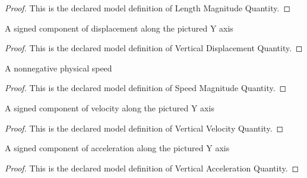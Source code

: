 \begin{proof}
  This is the declared model definition of Length Magnitude Quantity.
\end{proof}
\begin{definition}
  \label{def:physics:phyx-mini-0802:phyxminiproblems-problemphyxmini0802-verticaldisplacementquantity}
  A signed component of displacement along the pictured Y axis
\end{definition}
\begin{proof}
  This is the declared model definition of Vertical Displacement Quantity.
\end{proof}
\begin{definition}
  \label{def:physics:phyx-mini-0802:phyxminiproblems-problemphyxmini0802-speedmagnitudequantity}
  A nonnegative physical speed
\end{definition}
\begin{proof}
  This is the declared model definition of Speed Magnitude Quantity.
\end{proof}
\begin{definition}
  \label{def:physics:phyx-mini-0802:phyxminiproblems-problemphyxmini0802-verticalvelocityquantity}
  A signed component of velocity along the pictured Y axis
\end{definition}
\begin{proof}
  This is the declared model definition of Vertical Velocity Quantity.
\end{proof}
\begin{definition}
  \label{def:physics:phyx-mini-0802:phyxminiproblems-problemphyxmini0802-verticalaccelerationquantity}
  A signed component of acceleration along the pictured Y axis
\end{definition}
\begin{proof}
  This is the declared model definition of Vertical Acceleration Quantity.
\end{proof}

